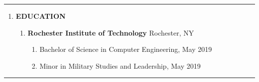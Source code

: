 \documentclass[11pt]{article}
\begin{document}
\textcolor{black!20}{\rule{\textwidth}{3pt}}
\begin{center}
\begin{enumerate}[label={}, leftmargin=0pt, parsep=5pt]
    \item {\Large \textbf{EDUCATION}}
    \begin{enumerate}[label={}, itemsep=5pt]
        \item \textbf{Rochester Institute of Technology} \textbar{} Rochester, NY
        \begin{enumerate}[label={--}]
            \item Bachelor of Science in Computer Engineering, May 2019
            \item Minor in Military Studies and Leadership, May 2019
        \end{enumerate}
    \end{enumerate}
\end{enumerate}
\end{center}
\textcolor{black!20}{\rule{\textwidth}{3pt}}
\end{document}
